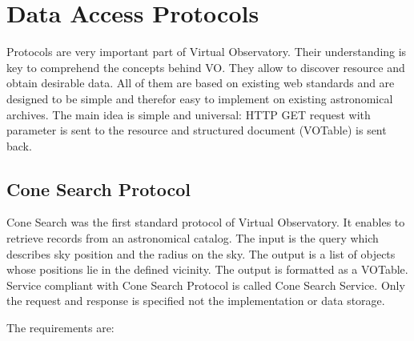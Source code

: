 

\section{Data Access Protocols}

Protocols are very important part of Virtual Observatory. Their
understanding is key to comprehend the concepts behind VO. They allow
to discover resource and obtain desirable data. All of them are based
on existing web standards and are designed to be simple and therefor
easy to implement on existing astronomical archives. The main idea is
simple and universal: HTTP GET request with parameter is sent to the
resource and structured document (VOTable) is sent back.

\subsection{Cone Search Protocol} \label{sec:csp}
Cone Search was the first standard protocol of Virtual Observatory. It
enables to retrieve records from an astronomical catalog. The input is
the query which describes sky position and the radius on the sky. The
output is a list of objects whose positions lie in the defined
vicinity. The output is formatted as a VOTable. Service compliant with
Cone Search Protocol is called Cone Search Service. Only the request
and response is specified not the implementation or data storage.


The requirements are:


